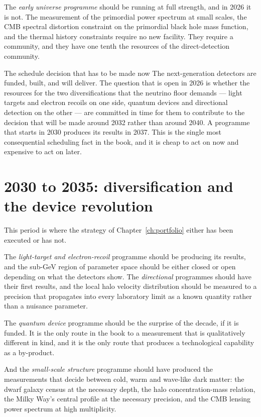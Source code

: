 The \emph{early universe programme} should be running at full strength, and
in 2026 it is not. The measurement of the primordial power spectrum at small
scales, the CMB spectral distortion constraint on the primordial black hole
mass function, and the thermal history constraints require no new facility.
They require a community, and they have one tenth the resources of the
direct-detection community.

\begin{takeaway}{The schedule decision that has to be made now}
The next-generation detectors are funded, built, and will deliver. The
question that is open in 2026 is whether the resources for the two
diversifications that the neutrino floor demands --- light targets and
electron recoils on one side, quantum devices and directional detection on
the other --- are committed in time for them to contribute to the decision
that will be made around 2032 rather than around 2040. A programme that
starts in 2030 produces its results in 2037. This is the single most
consequential scheduling fact in the book, and it is cheap to act on now and
expensive to act on later.\end{takeaway}

\section{2030 to 2035: diversification and the device revolution}This period is
where the strategy of Chapter~\ref{ch:portfolio} either has been executed
or has not.

The \emph{light-target and electron-recoil} programme should be producing its
results, and the sub-GeV region of parameter space should be either closed
or open depending on what the detectors show. The \emph{directional}
programmes should have their first results, and the local halo velocity
distribution should be measured to a precision that propagates into every
laboratory limit as a known quantity rather than a nuisance parameter.

The \emph{quantum device} programme should be the surprise of the decade,
if it is funded. It is the only route in the book to a measurement that is
qualitatively different in kind, and it is the only route that produces a
technological capability as a by-product.

And the \emph{small-scale structure} programme should have produced the
measurements that decide between cold, warm and wave-like dark matter: the
dwarf galaxy census at the necessary depth, the halo concentration-mass
relation, the Milky Way's central profile at the necessary precision, and
the CMB lensing power spectrum at high multiplicity.

